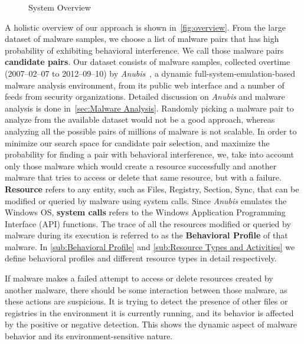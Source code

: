 \begin{figure}[h]
    \centering
    \def\svgwidth{\columnwidth}
    \scalebox{0.7}{}
\caption{System Overview}
\label{fig:overview}
\end{figure}
A holistic overview of our approach is shown in~\autoref{fig:overview}.
From the large dataset of malware samples, we choose a list of malware pairs that has high probability of exhibiting behavioral interference.
We call those malware pairs \textbf{candidate pairs}.
Our dataset consists of {\gettotalmalwarei{}} malware samples, collected overtime (2007--02--07 to 2012--09--10) by \emph{Anubis}~\cite[]{anubis}, a dynamic full-system-emulation-based malware analysis environment, from its public web interface and a number of feeds from security organizations.
Detailed discussion on \emph{Anubis} and malware analysis is done in~\autoref{sec:Malware Analysis}.
Randomly picking a malware pair to analyze from the available dataset would not be a good approach, whereas analyzing all the possible pairs of millions of malware is not scalable.
In order to minimize our search space for candidate pair selection, and maximize the probability for finding a pair with behavioral interference, we, take into account only those malware which would create a resource successfully and another malware that tries to access or delete that same resource, but with a failure.
\textbf{Resource} refers to any entity, such as Files, Registry, Section, Sync, that can be modified or queried by malware using system calls.
Since \emph{Anubis} emulates the Windows OS, \textbf{system calls} refers to the Windows Application Programming Interface (API) functions.
The trace of all the resources modified or queried by malware during its execution is referred to as the \textbf{Behavioral Profile} of that malware.
In \autoref{sub:Behavioral Profile} and \autoref{sub:Resource Types and Activities} we define behavioral profiles and different resource types in detail respectively.

If malware makes a failed attempt to access or delete resources created by another malware, there should be some interaction between those malware, as these actions are suspicious.
It is trying to detect the presence of other files or registries in the environment it is currently running, and its behavior is affected by the positive or negative detection.
This shows the dynamic aspect of malware behavior and its environment-sensitive nature.\\

